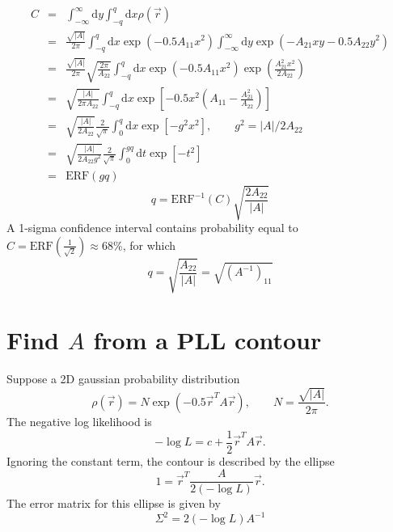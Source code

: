 \documentclass[12pt]{article}
\newcommand{\dee}{\mathrm{d}}
\newcommand{\abs}[1]{\left|#1\right|}
\begin{document}
\begin{eqnarray*}
  C 
  &=& \int_{-\infty}^{\infty}\dee y\int_{-q}^q \dee x \rho(\vec{r})\\
  &=& \frac{\sqrt{\abs{A}}}{2\pi} \int_{-q}^q \dee x \exp\left(-0.5 A_{11}x^2\right) \int_{-\infty}^{\infty}\dee y \exp\left(-A_{21}xy  -0.5A_{22}y^2 \right)\\
  &=& \frac{\sqrt{\abs{A}}}{2\pi} \sqrt{\frac{2\pi}{A_{22}}}\int_{-q}^q \dee x \exp\left(-0.5 A_{11}x^2\right) \exp\left(\frac{A_{21}^2x^2}{2A_{22}}\right)\\
  &=& \sqrt{\frac{\abs{A}}{2\pi A_{22}}}\int_{-q}^q \dee x \exp\left[-0.5 x^2\left( A_{11} - \frac{A_{21}^2}{A_{22}}\right)\right]\\
  &=& \sqrt{\frac{\abs{A}}{2 A_{22}}}\frac{2}{\sqrt{\pi}}\int_0^q \dee x \exp\left[- g^2x^2\right],\qquad g^2=\abs{A}/2A_{22} \\
  &=& \sqrt{\frac{\abs{A}}{2 A_{22}g^2}}\frac{2}{\sqrt{\pi}}\int_0^{gq} \dee t \exp\left[- t^2\right]\\
  &=& \mathrm{ERF}(gq)
\end{eqnarray*}
\begin{equation}
  q = \mathrm{ERF}^{-1}\left(C\right)\sqrt{\frac{2A_{22}}{\abs{A}}}
\end{equation}
A 1-sigma confidence interval contains probability equal to
$C=\mathrm{ERF}\left(\frac{1}{\sqrt{2}}\right)\approx 68\%$, for which
\[
q = \sqrt{\frac{A_{22}}{\abs{A}}} = \sqrt{\left(A^{-1}\right)_{11}}
\]

\section{Find $A$ from a PLL contour}

Suppose a 2D gaussian probability distribution
\[
\rho(\vec{r}) = N \exp(-0.5 \vec{r}^TA\vec{r}), \qquad N = \frac{\sqrt{\abs{A}}}{2\pi}.
\]
The negative log likelihood is 
\[
-\log L = c + \frac{1}{2} \vec{r}^TA\vec{r}.
\]
Ignoring the constant term, the contour is described by the ellipse
\[
1  = \vec{r}^T\frac{A}{2(-\log L)}\vec{r}.
\]
The error matrix for this ellipse is given by
\[
\Sigma^2 = 2(-\log L)A^{-1}
\]
\end{document}
